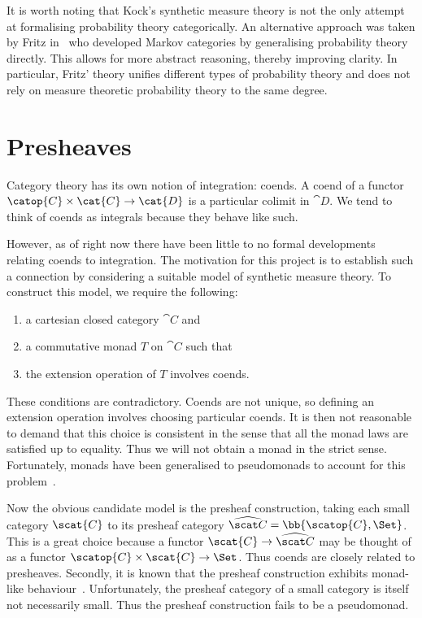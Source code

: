 It is worth noting that Kock's synthetic measure theory is not the only attempt at
formalising probability theory categorically. An alternative approach was taken by
Fritz in~\cite{fritz2020} who developed Markov categories by generalising probability
theory directly. This allows for more abstract reasoning,
thereby improving clarity. In particular, Fritz' theory unifies different types of probability
theory and does not rely on measure theoretic probability theory to the same degree.

\section{Presheaves}

Category theory has its own notion of integration: coends. A coend of a
functor $\catop{C}\times\cat{C}\to\cat{D}$ is a particular colimit in
$\cat{D}$. We tend to think of coends as integrals because they behave
like such.

However, as of right now there have been little to no formal developments
relating coends to integration. The motivation for this project is to
establish such a connection by considering a suitable model of synthetic
measure theory. To construct this model, we require the following:

\begin{enumerate}
  \item a cartesian closed category $\cat{C}$ and
  \item a commutative monad $T$ on $\cat{C}$ such that
  \item the extension operation of $T$ involves coends.
\end{enumerate}

These conditions are contradictory. Coends are not unique, so defining an
extension operation involves choosing particular coends. It is then not
reasonable to demand that this choice is consistent in the sense that all the
monad laws are satisfied up to equality. Thus we will not obtain a monad in the
strict sense. Fortunately, monads have been generalised to pseudomonads to
account for this problem~\cite{marmolejo2013}.

Now the obvious candidate model is the presheaf construction, taking each small
category $\scat{C}$ to its presheaf category $\widehat{\scat C} =
\bb{\scatop{C}, \Set}$. This is a great choice because a functor
$\scat{C}\to\widehat{\scat C}$ may be thought of as a functor
$\scatop{C}\times\scat{C}\to\Set$. Thus coends are closely related to
presheaves. Secondly, it is known that the presheaf construction exhibits
monad-like behaviour~\cite{fiore2017}. Unfortunately, the presheaf category of
a small category is itself not necessarily small. Thus the presheaf
construction fails to be a pseudomonad.

